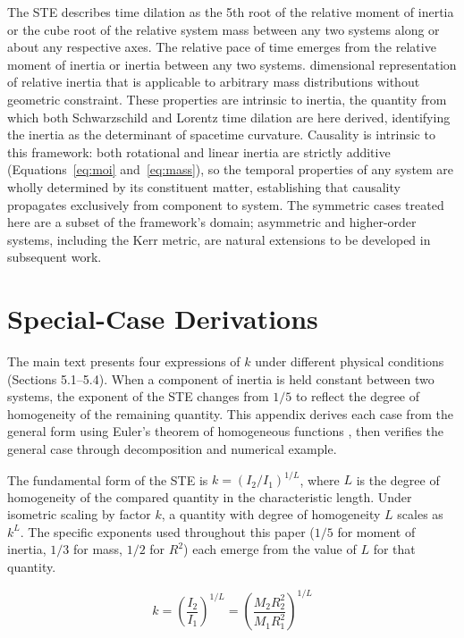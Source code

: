 The STE describes time dilation as the 5th root of the relative moment of inertia or the cube root of the relative system mass between any two systems along or about any respective axes. The relative pace of time emerges from the relative moment of inertia or inertia between any two systems. dimensional representation of relative inertia that is applicable to arbitrary mass distributions without geometric constraint. These properties are intrinsic to inertia, the quantity from which both Schwarzschild and Lorentz time dilation are here derived, identifying the inertia as the determinant of spacetime curvature. Causality is intrinsic to this framework: both rotational and linear inertia are strictly additive (Equations~\ref{eq:moi} and~\ref{eq:mass}), so the temporal properties of any system are wholly determined by its constituent matter, establishing that causality propagates exclusively from component to system. The symmetric cases treated here are a subset of the framework's domain; asymmetric and higher-order systems, including the Kerr metric, are natural extensions to be developed in subsequent work.

\appendix
\renewcommand{\thesection}{Appendix~\Alph{section}}
\section{Special-Case Derivations} \label{app:general_ste}

The main text presents four expressions of $k$ under different physical conditions (Sections 5.1--5.4). When a component of inertia is held constant between two systems, the exponent of the STE changes from $1/5$ to reflect the degree of homogeneity of the remaining quantity. This appendix derives each case from the general form using Euler's theorem of homogeneous functions \citep{widder1961}, then verifies the general case through decomposition and numerical example.

The fundamental form of the STE is $k = (I_2/I_1)^{1/L}$, where $L$ is the degree of homogeneity of the compared quantity in the characteristic length. Under isometric scaling by factor $k$, a quantity with degree of homogeneity $L$ scales as $k^L$. The specific exponents used throughout this paper ($1/5$ for moment of inertia, $1/3$ for mass, $1/2$ for $R^2$) each emerge from the value of $L$ for that quantity.

\begin{equation}
k = \left(\frac{I_2}{I_1}\right)^{1/L} = \left(\frac{M_2 R_2^2}{M_1 R_1^2}\right)^{1/L}
\end{equation}

